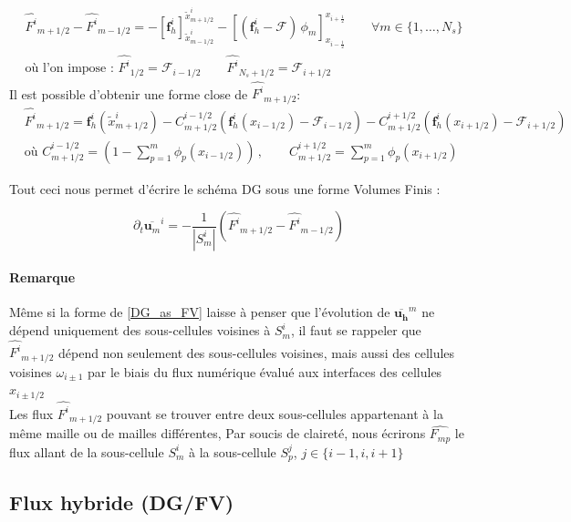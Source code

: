 \begin{align}
&\widehat{F^i}_{m+1/2} - \widehat{F^i}_{m-1/2} =  -  \left[\mathbf{f}_h^i\right]_{\tilde{x}^i_{m-1/2}}^{\tilde{x}^i_{m+1/2}}  - \left[ ( \mathbf{f}_h^i - \mathcal{F} )\, \phi_m \right]_{x_{i-\frac{1}{2}}}^{x_{i+\frac{1}{2}}} \qquad \forall m\in \{ 1, \dots, N_s\} \\
& \text{où l'on impose : } \widehat{F^i}_{1/2} = \mathcal{F}_{i-1/2} \qquad \widehat{F^i}_{ N_s + 1/2} = \mathcal{F}_{i+1/2}
\end{align}
Il est possible d'obtenir une forme close de $\widehat{F^i}_{m+1/2}$: 
\begin{align}
    &\widehat{F^i}_{m+1/2} = \mathbf{f}_h^i(\tilde{x}^i_{m+1/2}) 
    -C^{i-1/2}_{m+1/2} ( \mathbf{f}_h^i(x_{i-1/2}) - \mathcal{F}_{i-1/2}) 
    -C^{i+1/2}_{m+1/2} ( \mathbf{f}_h^i(x_{i+1/2}) - \mathcal{F}_{i+1/2}) \\
    & \text{où }  C^{i-1/2}_{m+1/2} = (1- \sum_{p=1}^{m}\phi_p(x_{i-1/2})) \, , \qquad
        C^{i+1/2}_{m+1/2} =     \sum_{p=1}^{m}\phi_p(x_{i+1/2})
\end{align}

Tout ceci nous permet d'écrire le schéma DG sous une forme Volumes Finis : 
 
\begin{equation}\label{DG_as_FV}
    \partial_t \overline{\mathbf{u}_m}^i = -\frac{1}{|S_m^i|}(\widehat{F^i}_{m+1/2} - \widehat{F^i}_{m-1/2})
\end{equation}

\paragraph{Remarque \\}
\noindent Même si la forme de \eqref{DG_as_FV} laisse à penser que l'évolution de $\overline{\mathbf{u_h}}^m$ 
ne dépend uniquement des sous-cellules voisines à $S_m^i$, 
il faut se rappeler que $\widehat{F^i}_{m+1/2}$ dépend non seulement des sous-cellules voisines, 
mais aussi des cellules voisines $\omega_{i\pm1}$ par le biais du flux numérique évalué aux interfaces des cellules $x_{i\pm1/2}$ \\

Les flux $\widehat{F^i}_{m+1/2}$ pouvant se trouver entre deux sous-cellules appartenant à la même maille ou de mailles différentes, 
Par soucis de claireté, nous écrirons $\widehat{F_{mp}}$ le flux allant de la sous-cellule $S_m^i$ à la sous-cellule $S_p^j$, $j\in \{i-1,i,i+1\}$ 

\subsection{Flux hybride (DG/FV)}

